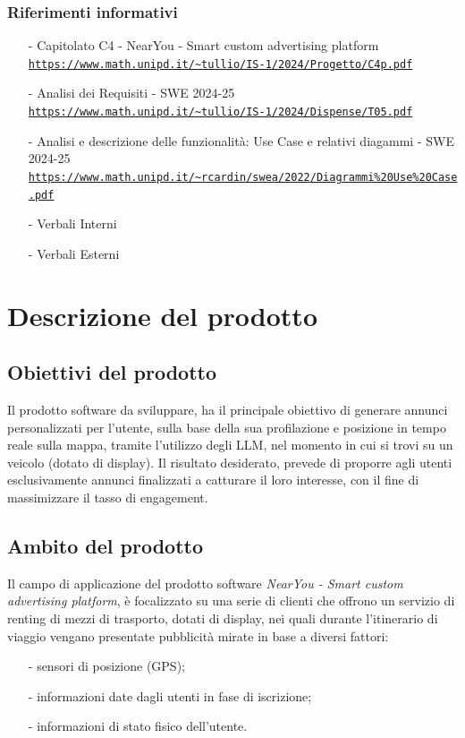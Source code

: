 \documentclass[11pt]{article}
\begin{document}
\begin{justify}
\subsubsection{Riferimenti informativi}
\begin{itemize}
    \item[-] Capitolato C4 - NearYou - Smart custom advertising platform\\
    \textcolor{blue}{\texttt{\url{https://www.math.unipd.it/~tullio/IS-1/2024/Progetto/C4p.pdf}}}
    \item[-] Analisi dei Requisiti - SWE 2024-25\\
    \textcolor{blue}{\texttt{\url{https://www.math.unipd.it/~tullio/IS-1/2024/Dispense/T05.pdf}}}
    \item[-] Analisi e descrizione delle funzionalità: Use Case e relativi diagammi - SWE 2024-25\\    
    \textcolor{blue}{\texttt{\url{https://www.math.unipd.it/~rcardin/swea/2022/Diagrammi\%20Use\%20Case.pdf}}}
    \item[-] Verbali Interni
    \item[-] Verbali Esterni
    
\end{itemize}

\newpage
\section{Descrizione del prodotto}
\label{sec:descrizione}
\subsection{Obiettivi del prodotto}
Il prodotto software da sviluppare, ha il principale obiettivo di generare annunci personalizzati per l'utente, sulla base della sua profilazione e posizione in tempo reale sulla mappa, tramite l'utilizzo degli LLM, nel momento in cui si trovi su un veicolo (dotato di display). Il risultato desiderato, prevede di proporre agli utenti esclusivamente annunci finalizzati a catturare il loro interesse, con il fine di massimizzare il tasso di engagement.

\subsection{Ambito del prodotto}
Il campo di applicazione del prodotto software \textit{NearYou - 
Smart custom advertising platform}, è focalizzato su una serie di clienti che offrono un servizio di renting di mezzi di trasporto, dotati di display, nei quali durante l'itinerario di viaggio vengano presentate pubblicità mirate in base a diversi fattori:
\begin{itemize}
    \item [-] sensori di posizione (GPS);
    \item [-] informazioni date dagli utenti in fase di iscrizione;
    \item [-] informazioni di stato fisico dell’utente.
\end{itemize}


\end{justify}
\end{document}
